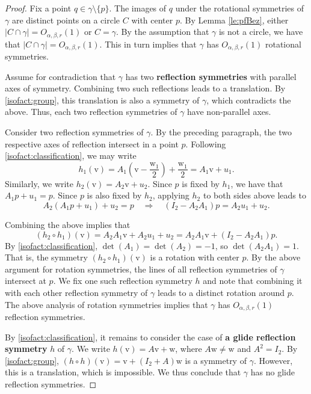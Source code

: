 \documentclass[10pt,a4paper]{amsart}
\newcommand*{\vecv}{\mathrm{v}}
\newcommand*{\vecw}{\mathrm{w}}
\begin{document}
\begin{proof}
Fix a point $q\in \gamma\setminus\{p\}$.  The images of $q$ under the rotational symmetries of $\gamma$ are distinct points on a circle $C$ with center $p$.
By Lemma \ref{le:pfBez}, either $|C \cap \gamma|=O_{\alpha,\beta,r}(1)$ or $C=\gamma$.
By the assumption that $\gamma$ is not a circle, we have that $|C \cap \gamma|=O_{\alpha,\beta,r}(1)$.
This in turn implies that $\gamma$ has $O_{\alpha,\beta,r}(1)$ rotational symmetries. 

Assume for contradiction that $\gamma$ has two {\bf reflection symmetries} with parallel axes of symmetry. 
Combining two such reflections leads to a translation. 
By \ref{isofact:group}, this translation is also a symmetry of $\gamma$, which contradicts the above.
Thus, each two reflection symmetries of $\gamma$ have non-parallel axes.

Consider two reflection symmetries of $\gamma$.
By the preceding paragraph, the two respective axes of reflection intersect in a point $p$. 
Following \ref{isofact:classification}, we may write
%
\[ h_1(\vecv) = A_1\left(\vecv - \frac{\vecw_1}{2}\right) + \frac{\vecw_1}{2} = A_1\vecv + u_1.  \]
Similarly, we write $h_2(\vecv) = A_2\vecv + u_2$.
Since $p$ is fixed by $h_1$, we have that $A_1 p + u_1 = p$.
Since $p$ is also fixed by $h_2$, applying $h_2$ to both sides above leads to
%
\begin{equation*} %
A_2(A_1 p + u_1) + u_2 = p \quad \Rightarrow \quad (I_2-A_2A_1)p = A_2 u_1 + u_2.  
\end{equation*}

Combining the above implies that
%
\[ (h_2 \circ h_1)(\vecv) = A_2A_1\vecv + A_2u_1 + u_2 = A_2A_1\vecv + (I_2 - A_2A_1)p. \]
%
By \ref{isofact:classification}, $\det(A_1)=\det(A_2)=-1$, so $\det(A_2A_1)=1$.
That is, the symmetry $(h_2 \circ h_1)(\vecv)$ is a rotation with center $p$.
By the above argument for rotation symmetries, the lines of all reflection symmetries of $\gamma$ intersect at $p$.
We fix one such reflection symmetry $h$ and note that combining it with each other reflection symmetry of $\gamma$ leads to a distinct rotation around $p$.
The above analysis of rotation symmetries implies that $\gamma$ has $O_{\alpha,\beta,r}(1)$ reflection symmetries. 

By \ref{isofact:classification}, it remains to consider the case of {\bf a glide reflection symmetry} $h$ of $\gamma$.
We write $h(\vecv) = A\vecv + \vecw$, where  $A\vecw \neq \vecw$ and $A^2=I_2$.
By \ref{isofact:group}, $(h \circ h)(\vecv) = \vecv + (I_2 + A)\vecw$ is a symmetry of $\gamma$.
However, this is a translation, which is impossible. 
We thus conclude that $\gamma$ has no glide reflection symmetries.
%
\end{proof}
\end{document}
